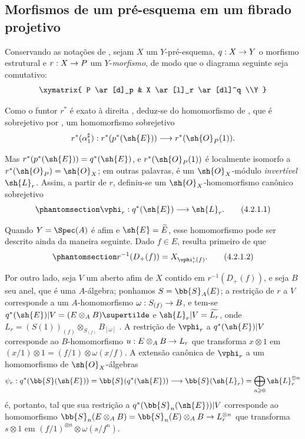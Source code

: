 \documentclass[oneside,10pt]{amsart}
\makeatletter
\renewcommand{\geq}{\geqslant}
\newcommand{\ega@arrow}[2]{\mathchoice{#1}{#2}{#2}{#2}}
\renewcommand{\to}{\ega@arrow{\longrightarrow}{\rightarrow}}
\newcommand{\oldpage}[2][]{\marginnote{\normalfont\footnotesize\textbf{#1}~|~#2}\ignorespaces}
\let\EGAOriginalLabel\label
\renewcommand{\label}[1]{\phantomsection\EGAOriginalLabel{#1}}
\makeatother
\begin{document}
\subsection{Morfismos de um pré-esquema em um fibrado projetivo}
\label{subsection:II.4.2}

\begin{env}[4.2.1]
\label{II.4.2.1}
Conservando as notações de , sejam $X$ um $Y$-pré-esquema, $q:X\to Y$ o morfismo estrutural e $r:X\to P$ um $Y$-\emph{morfismo}, de modo que o diagrama seguinte seja comutativo:
\[
  \xymatrix{
    P \ar[d]_p & X \ar[l]_r \ar[dl]^q
  \\Y
  }
\]
\oldpage[II]{73}

Como o funtor $r^*$ é exato à direita , deduz-se do homomorfismo de , que é sobrejetivo por , um homomorfismo sobrejetivo
\[
  r^*(\alpha_1^\sharp): r^*(p^*(\sh{E})) \to r^*(\sh{O}_P(1)).
\]

Mas $r^*(p^*(\sh{E}))=q^*(\sh{E})$, e $r^*(\sh{O}_P(1))$ é localmente isomorfo a $r^*(\sh{O}_P)=\sh{O}_X$; em outras palavras, é um $\sh{O}_X$-módulo \emph{invertível} $\sh{L}_r$.
Assim, a partir de $r$, definiu-se um $\sh{O}_X$-homomorfismo canônico sobrejetivo
\[
\label{II.4.2.1.1}
  \vphi_r:q^*(\sh{E}) \to \sh{L}_r.
  \tag{4.2.1.1}
\]

Quando $Y=\Spec(A)$ é afim e $\sh{E}=\widetilde{E}$, esse homomorfismo pode ser descrito ainda da maneira seguinte.
Dado $f\in E$, resulta primeiro de  que
\[
\label{II.4.2.1.2}
  r^{-1}(D_+(f)) = X_{\vphi_r^\flat(f)}.
  \tag{4.2.1.2}
\]

Por outro lado, seja $V$ um aberto afim de $X$ contido em $r^{-1}(D_+(f))$, e seja $B$ seu anel, que é uma $A$-álgebra;
ponhamos $S=\bb{S}_A(E)$;
a restrição de $r$ a $V$ corresponde a um $A$-homomorfismo $\omega:S_{(f)}\to B$, e tem-se $q^*(\sh{E})|V=(E\otimes_A B)\supertilde$ e $\sh{L}_r|V=\widetilde{L_r}$, onde $L_r=(S(1))_{(f)}\otimes_{S_{(f)}}B_{[\omega]}$ .
A restrição de $\vphi_r$ a $q^*(\sh{E})|V$ corresponde ao $B$-homomorfismo $u:E\otimes_A B\to L_r$ que transforma $x\otimes1$ em $(x/1)\otimes1=(f/1)\otimes\omega(x/f)$.
A extensão canônica de $\vphi_r$ a um homomorfismo de $\sh{O}_X$-álgebras
\[
  \psi_r: q^*(\bb{S}(\sh{E})) = \bb{S}(q^*(\sh{E})) \to \bb{S}(\sh{L}_r) = \bigoplus_{n\geq0}\sh{L}_r^{\otimes n}
\]
é, portanto, tal que sua restrição a $q^*(\bb{S}_n(\sh{E}))|V$ corresponde ao homomorfismo $\bb{S}_n(E\otimes_A B)=\bb{S}_n(E)\otimes_A B\to L_r^{\otimes n}$ que transforma $s\otimes1$ em $(f/1)^{\otimes n}\otimes\omega(s/f^n)$.
\end{env}
\end{document}
